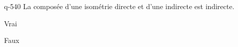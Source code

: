 \begin{truefalse}{q-540}
La composée d'une isométrie directe et d'une indirecte est indirecte.
\item* Vrai
\item Faux
\end{truefalse}

